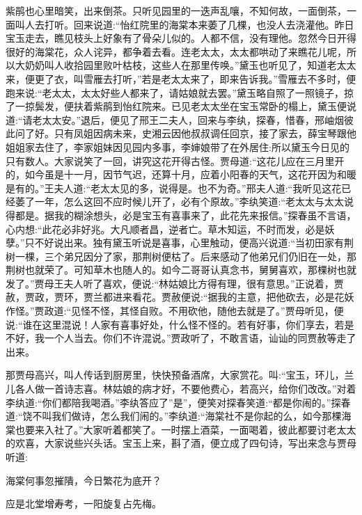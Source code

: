 \begin{parag}
    紫鹃也心里暗笑，出来倒茶。只听见园里的一迭声乱嚷，不知何故，一面倒茶，一面叫人去打听。回来说道:“怡红院里的海棠本来萎了几棵，也没人去浇灌他。昨日宝玉走去，瞧见枝头上好象有了骨朵儿似的。人都不信，没有理他。忽然今日开得很好的海棠花，众人诧异，都争着去看。连老太太，太太都哄动了来瞧花儿呢，所以大奶奶叫人收拾园里败叶枯枝，这些人在那里传唤。”黛玉也听见了，知道老太太来，便更了衣，叫雪雁去打听，”若是老太太来了，即来告诉我。”雪雁去不多时，便跑来说:“老太太，太太好些人都来了，请姑娘就去罢。”黛玉略自照了一照镜子，掠了一掠鬓发，便扶着紫鹃到怡红院来。已见老太太坐在宝玉常卧的榻上，黛玉便说道:“请老太太安。”退后，便见了邢王二夫人，回来与李纨，探春，惜春，邢岫烟彼此问了好。只有凤姐因病未来，史湘云因他叔叔调任回京，接了家去，薛宝琴跟他姐姐家去住了，李家姐妹因见园内多事，李婶娘带了在外居住:所以黛玉今日见的只有数人。大家说笑了一回，讲究这花开得古怪。贾母道:“这花儿应在三月里开的，如今虽是十一月，因节气迟，还算十月，应着小阳春的天气，这花开因为和暖是有的。”王夫人道:“老太太见的多，说得是。也不为奇。”邢夫人道:“我听见这花已经萎了一年，怎么这回不应时候儿开了，必有个原故。”李纨笑道:“老太太与太太说得都是。据我的糊涂想头，必是宝玉有喜事来了，此花先来报信。”探春虽不言语，心内想:“此花必非好兆。大凡顺者昌，逆者亡。草木知运，不时而发，必是妖孽。”只不好说出来。独有黛玉听说是喜事，心里触动，便高兴说道:“当初田家有荆树一棵，三个弟兄因分了家，那荆树便枯了。后来感动了他弟兄们仍旧在一处，那荆树也就荣了。可知草木也随人的。如今二哥哥认真念书，舅舅喜欢，那棵树也就发了。”贾母王夫人听了喜欢，便说:“林姑娘比方得有理，很有意思。”正说着，贾赦，贾政，贾环，贾兰都进来看花。贾赦便说:“据我的主意，把他砍去，必是花妖作怪。”贾政道:“见怪不怪，其怪自败。不用砍他，随他去就是了。”贾母听见，便说:“谁在这里混说！人家有喜事好处，什么怪不怪的。若有好事，你们享去，若是不好，我一个人当去。你们不许混说。”贾政听了，不敢言语，讪讪的同贾赦等走了出来。
\end{parag}


\begin{parag}
    那贾母高兴，叫人传话到厨房里，快快预备酒席，大家赏花。叫:“宝玉，环儿，兰儿各人做一首诗志喜。林姑娘的病才好，不要他费心，若高兴，给你们改改。”对着李纨道:“你们都陪我喝酒。”李纨答应了”是”，便笑对探春笑道:“都是你闹的。”探春道:“饶不叫我们做诗，怎么我们闹的。”李纨道:“海棠社不是你起的么，如今那棵海棠也要来入社了。”大家听着都笑了。一时摆上酒菜，一面喝着，彼此都要讨老太太的欢喜，大家说些兴头话。宝玉上来，斟了酒，便立成了四句诗，写出来念与贾母听道:
\end{parag}


\begin{poem}
    \begin{pl}
        海棠何事忽摧隤，今日繁花为底开？
    \end{pl}


    \begin{pl}
        应是北堂增寿考，一阳旋复占先梅。
    \end{pl}

\end{poem}


